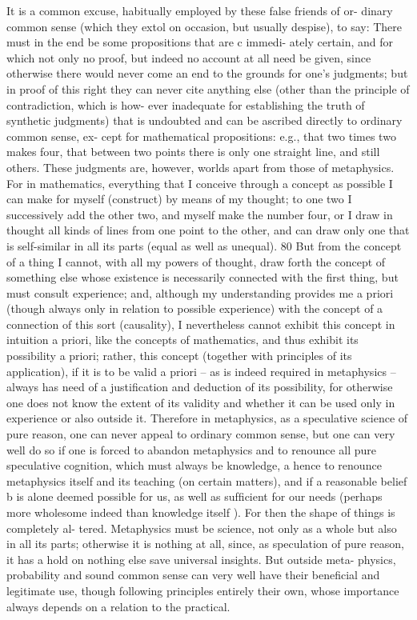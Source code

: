 It is a common excuse, habitually employed by these false friends of or-
dinary common sense (which they extol on occasion, but usually despise),
to say: There must in the end be some propositions that are c immedi-
ately certain, and for which not only no proof, but indeed no account at
all need be given, since otherwise there would never come an end to the
grounds for one’s judgments; but in proof of this right they can never cite
anything else (other than the principle of contradiction, which is how-
ever inadequate for establishing the truth of synthetic judgments) that is
undoubted and can be ascribed directly to ordinary common sense, ex-
cept for mathematical propositions: e.g., that two times two makes four,
that between two points there is only one straight line, and still others.
These judgments are, however, worlds apart from those of metaphysics.
For in mathematics, everything that I conceive through a concept as
possible I can make for myself (construct) by means of my thought; to
one two I successively add the other two, and myself make the number
four, or I draw in thought all kinds of lines from one point to the other,
and can draw only one that is self-similar in all its parts (equal as well as
unequal). 80 But from the concept of a thing I cannot, with all my powers
of thought, draw forth the concept of something else whose existence is
necessarily connected with the ﬁrst thing, but must consult experience;
and, although my understanding provides me a priori (though always only
in relation to possible experience) with the concept of a connection of
this sort (causality), I nevertheless cannot exhibit this concept in intuition
a priori, like the concepts of mathematics, and thus exhibit its possibility a
priori; rather, this concept (together with principles of its application), if
it is to be valid a priori – as is indeed required in metaphysics – always has
need of a justiﬁcation and deduction of its possibility, for otherwise one
does not know the extent of its validity and whether it can be used only in
experience or also outside it. Therefore in metaphysics, as a speculative
science of pure reason, one can never appeal to ordinary common sense,
but one can very well do so if one is forced to abandon metaphysics
and to renounce all pure speculative cognition, which must always be
knowledge, a hence to renounce metaphysics itself and its teaching (on
certain matters), and if a reasonable belief b is alone deemed possible for
us, as well as sufﬁcient for our needs (perhaps more wholesome indeed
than knowledge itself ). For then the shape of things is completely al-
tered. Metaphysics must be science, not only as a whole but also in all its
parts; otherwise it is nothing at all, since, as speculation of pure reason,
it has a hold on nothing else save universal insights. But outside meta-
physics, probability and sound common sense can very well have their
beneﬁcial and legitimate use, though following principles entirely their
own, whose importance always depends on a relation to the practical.

